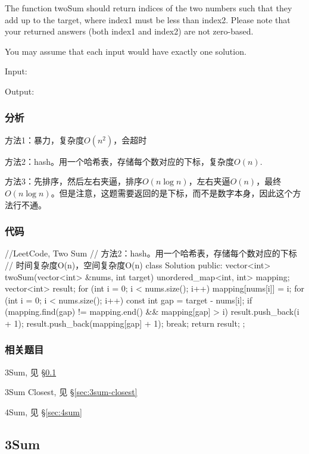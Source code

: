 The function twoSum should return indices of the two numbers such that they add up to the target, where index1 must be less than index2. Please note that your returned answers (both index1 and index2) are not zero-based.

You may assume that each input would have exactly one solution.

Input:  

Output: 


\subsubsection{分析}
方法1：暴力，复杂度$O(n^2)$，会超时

方法2：hash。用一个哈希表，存储每个数对应的下标，复杂度$O(n)$.

方法3：先排序，然后左右夹逼，排序$O(n\log n)$，左右夹逼$O(n)$，最终$O(n\log n)$。但是注意，这题需要返回的是下标，而不是数字本身，因此这个方法行不通。


\subsubsection{代码}
\begin{Code}
//LeetCode, Two Sum
// 方法2：hash。用一个哈希表，存储每个数对应的下标
// 时间复杂度O(n)，空间复杂度O(n)
class Solution {
public:
    vector<int> twoSum(vector<int> &nums, int target) {
        unordered_map<int, int> mapping;
        vector<int> result;
        for (int i = 0; i < nums.size(); i++) {
            mapping[nums[i]] = i;
        }
        for (int i = 0; i < nums.size(); i++) {
            const int gap = target - nums[i];
            if (mapping.find(gap) != mapping.end() && mapping[gap] > i) {
                result.push_back(i + 1);
                result.push_back(mapping[gap] + 1);
                break;
            }
        }
        return result;
    }
};
\end{Code}


\subsubsection{相关题目}
\begindot
\item 3Sum, 见 \S \ref{sec:3sum}
\item 3Sum Closest, 见 \S \ref{sec:3sum-closest}
\item 4Sum, 见 \S \ref{sec:4sum}
\myenddot


\subsection{3Sum} %
\label{sec:3sum}


